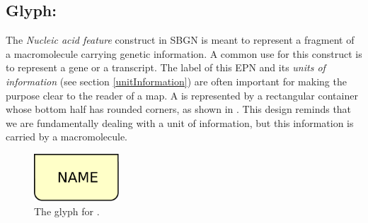 
\subsection{Glyph: }
\label{sec:genetic}

The \emph{Nucleic acid feature} construct in SBGN is meant to represent a fragment of a macromolecule carrying genetic information.  A common use for this construct is to represent a gene or a transcript.  The label of this EPN and its \emph{units of information} (see section \ref{unitInformation}) are often important for making the purpose clear to the reader of a map. A  is represented by a rectangular container whose bottom half has rounded corners, as shown in . This design reminds that we are fundamentally dealing with a unit of information, but this information is carried by a macromolecule.

\begin{figure}[H]
  \centering
  \includegraphics[width = 1.25in]{images/genetic}
  \caption{The \PD glyph for .} 
  \label{fig:genetic}
\end{figure}
